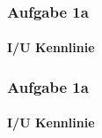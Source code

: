 \begin{frame}
    \frametitle{Aufgabe 1a}
    \framesubtitle{I/U Kennlinie}
    \begin{figure}[H]
    \begin{center}
    \end{center}
    \end{figure}
\end{frame}
\begin{frame}
    \frametitle{Aufgabe 1a}
    \framesubtitle{I/U Kennlinie}
    \begin{figure}[H]
    \begin{center}
    \end{center}
    \end{figure}
\end{frame}
